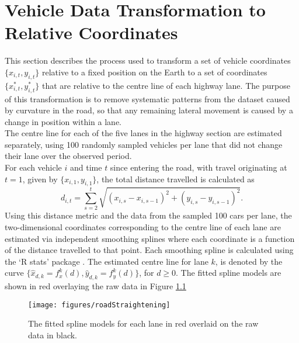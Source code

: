\documentclass[
12pt, %
onehalfspacing, %
nohyperref, %
headsepline, %
chapterinoneline, %
]{MastersDoctoralThesis} %
\begin{document}
\chapter{Vehicle Data Transformation to Relative Coordinates}

This section describes the process used to transform a set of vehicle coordinates $\{x_{i, t}, y_{i, t}\}$ relative to a fixed position on the Earth to a set of coordinates $\{x^*_{i, t}, y^*_{i, t}\}$ that are relative to the centre line of each highway lane.  The purpose of this transformation is to remove systematic patterns from the dataset caused by curvature in the road, so that any remaining lateral movement is caused by a change in position within a lane. 
\\

The centre line for each of the five lanes in the highway section are estimated separately, using 100 randomly sampled vehicles per lane that did not change their lane over the observed period. 
\\

For each vehicle $i$ and time $t$ since entering the road, with travel originating at $t = 1$, given by $\{x_{i,1}, y_{i,1}\}$, the total distance travelled is calculated as 
\begin{equation}
\label{transform:distance}
d_{i, t} = \sum_{s=2}^t \sqrt{(x_{i, s} - x_{i, s-1})^2 + (y_{i, s} - y_{i, s-1})^2}.
\end{equation}
Using this distance metric and the data from the sampled 100 cars per lane, the two-dimensional coordinates corresponding to the centre line of each lane are estimated via independent smoothing splines where each coordinate is a function of the distance travelled to that point. Each smoothing spline is calculated using the `R stats' package \citep{R}. The estimated centre line for lane $k$, is denoted by the curve $\{\hat{x}_{d,k} = f_{x}^k(d), \hat{y}_{d,k} = f_{y}^k(d)\}$, for $d \geq 0$. The fitted spline models are shown in red overlaying the raw data in Figure \ref{fig:transform}
\\

\begin{figure}[htbp]
\centering
\texttt{[image: figures/roadStraightening]}
\caption{The fitted spline models for each lane in red overlaid on the raw data in black.}
\label{fig:transform}
\end{figure}
\end{document}
